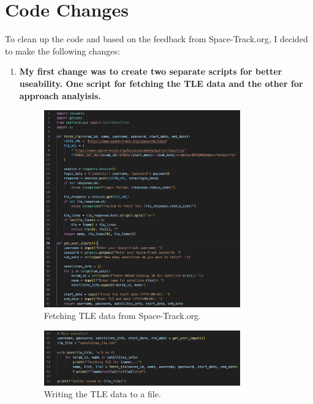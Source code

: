 \documentclass[12pt]{report}
\begin{document}
\chapter*{Code Changes}

To clean up the code and based on the feedback from Space-Track.org, I decided to make the following changes:

\begin{enumerate}
  
  \item \textbf{My first change was to create two separate scripts for better useability. One script for fetching the TLE data and the other for approach analyisis.}
  
  \begin{figure}[H]
    \centering
    \includegraphics[width=0.8\textwidth]{figure_week_6_fetch-tle-data1.png}
    \caption{Fetching TLE data from Space-Track.org.}
    \label{fig:fetch-tle-data1}
  \end{figure}

  \begin{figure}[H]
    \centering
    \includegraphics[width=0.8\textwidth]{figure_week_6_fetch-tle-data2.png}
    \caption{Writing the TLE data to a file.}
    \label{fig:analyze-approach}
  \end{figure}


\end{enumerate}
\end{document}
